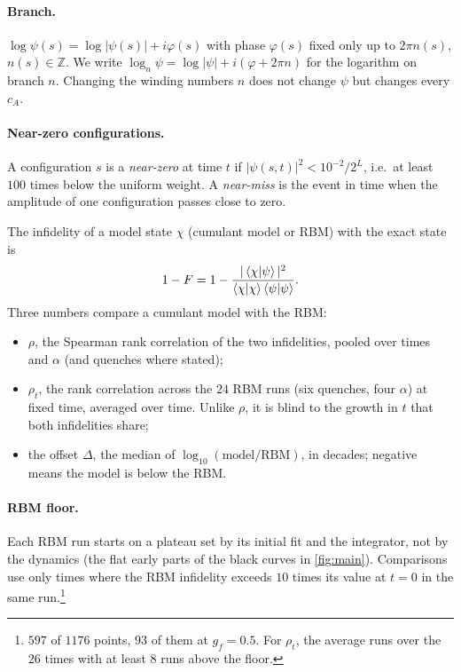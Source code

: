 \documentclass[11pt,a4paper]{article}
\begin{document}
\paragraph{Branch.} $\log\psi(s)=\log|\psi(s)|+i\varphi(s)$ with phase $\varphi(s)$ fixed only up to $2\pi n(s)$, $n(s)\in\mathbb{Z}$. We write $\log_n\psi=\log|\psi|+i(\varphi+2\pi n)$ for the logarithm on branch $n$. Changing the winding numbers $n$ does not change $\psi$ but changes every $c_A$.

\paragraph{Near-zero configurations.} A configuration $s$ is a \emph{near-zero} at time $t$ if $|\psi(s,t)|^2<10^{-2}/2^L$, i.e.\ at least $100$ times below the uniform weight. A \emph{near-miss} is the event in time when the amplitude of one configuration passes close to zero.

\begin{definition}
The infidelity of a model state $\chi$ (cumulant model or RBM) with the exact state is
\[
  1-F=1-\frac{|\braket{\chi|\psi}|^2}{\braket{\chi|\chi}\braket{\psi|\psi}}.
\]
Three numbers compare a cumulant model with the RBM:
\begin{itemize}
  \item $\rho$, the Spearman rank correlation of the two infidelities, pooled over times and $\alpha$ (and quenches where stated);
  \item $\rho_t$, the rank correlation across the $24$ RBM runs (six quenches, four $\alpha$) at fixed time, averaged over time. Unlike $\rho$, it is blind to the growth in $t$ that both infidelities share;
  \item the offset $\Delta$, the median of $\log_{10}(\text{model}/\text{RBM})$, in decades; negative means the model is below the RBM.
\end{itemize}
\end{definition}

\paragraph{RBM floor.} Each RBM run starts on a plateau set by its initial fit and the integrator, not by the dynamics (the flat early parts of the black curves in \cref{fig:main}). Comparisons use only times where the RBM infidelity exceeds $10$ times its value at $t=0$ in the same run.\footnote{$597$ of $1176$ points, $93$ of them at $g_f=0.5$. For $\rho_t$, the average runs over the $26$ times with at least $8$ runs above the floor.}
\end{document}
